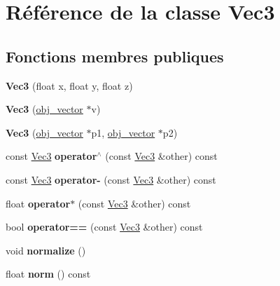 \hypertarget{class_vec3}{\section{Référence de la classe Vec3}
\label{class_vec3}
}
\subsection*{Fonctions membres publiques}
\begin{DoxyCompactItemize}
\item 
\hypertarget{class_vec3_a842ccdcdb2b4c7ca7cef20e6e786a231}{{\bfseries Vec3} (float x, float y, float z)}\label{class_vec3_a842ccdcdb2b4c7ca7cef20e6e786a231}

\item 
\hypertarget{class_vec3_ab0166900ca119ef6e3b7d928cc40fe4a}{{\bfseries Vec3} (\hyperlink{structobj__vector}{obj\-\_\-vector} $\ast$v)}\label{class_vec3_ab0166900ca119ef6e3b7d928cc40fe4a}

\item 
\hypertarget{class_vec3_a428e2ccce86f110a37f3291825f05e8d}{{\bfseries Vec3} (\hyperlink{structobj__vector}{obj\-\_\-vector} $\ast$p1, \hyperlink{structobj__vector}{obj\-\_\-vector} $\ast$p2)}\label{class_vec3_a428e2ccce86f110a37f3291825f05e8d}

\item 
\hypertarget{class_vec3_a4931806f11adc8e9b5a9b6f011b0ea4f}{const \hyperlink{class_vec3}{Vec3} {\bfseries operator$^\wedge$} (const \hyperlink{class_vec3}{Vec3} \&other) const }\label{class_vec3_a4931806f11adc8e9b5a9b6f011b0ea4f}

\item 
\hypertarget{class_vec3_ac036ec1f148a700490aae0b8958809fa}{const \hyperlink{class_vec3}{Vec3} {\bfseries operator-\/} (const \hyperlink{class_vec3}{Vec3} \&other) const }\label{class_vec3_ac036ec1f148a700490aae0b8958809fa}

\item 
\hypertarget{class_vec3_a21d1b56373372cdbe01345af63b8e274}{float {\bfseries operator$\ast$} (const \hyperlink{class_vec3}{Vec3} \&other) const }\label{class_vec3_a21d1b56373372cdbe01345af63b8e274}

\item 
\hypertarget{class_vec3_a4081cea9cbb7668d9ac5666072cacda1}{bool {\bfseries operator==} (const \hyperlink{class_vec3}{Vec3} \&other) const }\label{class_vec3_a4081cea9cbb7668d9ac5666072cacda1}

\item 
\hypertarget{class_vec3_a3a6631559d1d36eaf34ca586ce86ede1}{void {\bfseries normalize} ()}\label{class_vec3_a3a6631559d1d36eaf34ca586ce86ede1}

\item 
\hypertarget{class_vec3_a85037fb497ccaf866867da14f43b63c5}{float {\bfseries norm} () const }\label{class_vec3_a85037fb497ccaf866867da14f43b63c5}

\end{DoxyCompactItemize}

